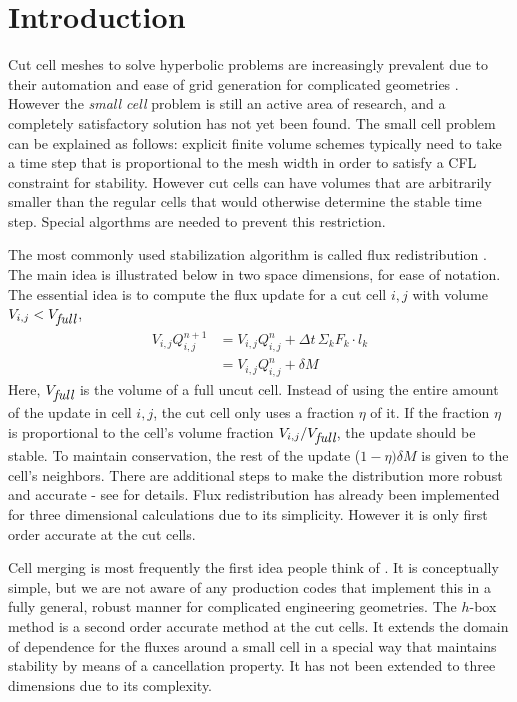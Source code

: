 \section{Introduction}\label{sec:intro}
Cut cell meshes to solve hyperbolic problems 
are increasingly prevalent due to their automation and ease 
of grid generation for complicated geometries \cite{}. 
However the {\em small cell} problem is still an active area of research, and
a completely satisfactory solution has not yet been found.
The small cell problem can be explained as follows: explicit
finite volume schemes typically need to take a time step 
that is proportional to the mesh width in order to satisfy a CFL constraint for
stability. However cut cells can have volumes that are arbitrarily
smaller than the regular cells that would otherwise determine the stable time
step. Special algorthms are needed to prevent this restriction.

The most commonly used stabilization algorithm is called flux
redistribution \cite{}. The main idea is illustrated below in two space
dimensions, for ease of notation.
The essential idea is to compute the 
flux update for a cut cell $i,j$ with volume $V_{i,j} < V_{\mbox{\em full}}$,
\begin{eqnarray*}
V_{i,j} Q_{i,j} ^{n+1} & = V_{i,j} Q_{i,j}^n  +  \Delta t \, \Sigma_k F_k \cdot l_{k}\\
                   & = V_{i,j} Q_{i,j}^n  +  \delta  M 
\end{eqnarray*}
Here, $V_{\mbox{\em full}}$ is the volume of a full uncut cell.
Instead of using the entire amount of the update in cell ${i,j}$, 
the cut cell only uses a fraction $\eta$ of it.  If the fraction $\eta$
is proportional to the cell's volume
fraction $V_{i,j}/V_{\mbox{\em full}}$, the update should be stable. 
To maintain conservation, the rest of the update ($1-\eta)\delta M$
is given to the cell's neighbors.  
There are additional steps to make the distribution more robust and
accurate - see \cite{} for details.
Flux redistribution has already been implemented for three dimensional
calculations due to its simplicity. However it is only first order
accurate at the cut cells.

Cell merging \cite{} is most frequently the first idea people 
think of . It is conceptually simple, but 
we are not aware of any production codes that implement this in a fully
general, robust manner for complicated engineering geometries. 
The $h$-box method \cite{}
is a second order accurate method at the cut cells. It extends the 
domain of dependence for the fluxes around a small cell in a 
special way that maintains stability by means of a cancellation
property. It  has not been extended to
three dimensions due to its complexity. 

